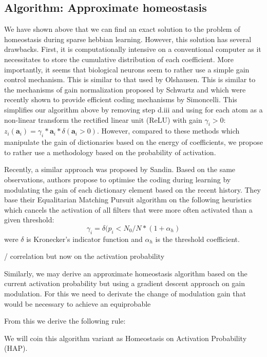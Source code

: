 \documentclass[a4paper, 11pt, draft]{article} %
\newcommand{\coef}{\mathbf{a}} %
\begin{document}
\subsection{Algorithm: Approximate homeostasis}\label{HAP}
We have shown above that we can find an exact solution to the problem of homeostasis during sparse hebbian learning. However, this solution has several drawbacks. First, it is computationally intensive on a conventional computer as it necessitates to store the cumulative distribution of each coefficient. More importantly, it seems that biological neurons seem to rather use a simple gain control mechanism. This is similar to that used by Olshausen. This is similar to the mechanisms of gain normalization proposed by Schwartz and which were recently shown to provide efficient coding mechanisms by Simoncelli. This simplifies our algorithm above by removing step d.iii and using for each atom as a non-linear transform the rectified linear unit (ReLU) with gain $\gamma_i>0$:  $z_i (\coef_i) = \gamma_i * \coef_i * \delta(\coef_i>0)$. However, compared to these methods which manipulate the gain of dictionaries based on the energy of coefficients, we propose to rather use a methodology based on the probability of activation. 

Recently, a similar approach was proposed by Sandin. Based on the same observations, authors propose to optimise the coding during learning by modulating the gain of each dictionary element based on the recent history. They base their Equalitarian Matching Pursuit  algorithm on the following heuristics which cancels the activation of all filters that were more often activated than a given threshold:
$$ \gamma_i = \delta (p_i <  N_0/N*(1+\alpha_h)  $$
were $\delta$ is Kronecker's indicator function and  $\alpha_h$ is the threshold coefficient. 

 / correlation but now on the activation probability

Similarly, we may derive an approximate homeostasis algorithm based on the current activation probability but using a gradient descent approach on gain modulation. 
For this we need to derivate the change of modulation gain that would be necessary to achieve an equiprobable 

From this we derive the following rule:

We will coin this algorithm variant as Homeostasis on Activation Probability (HAP).

\end{document}
